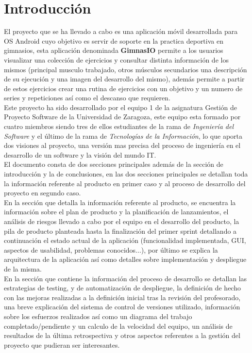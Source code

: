 \documentclass[11pt,a4paper]{report}
\begin{document}
\chapter{Introducción}
El proyecto que se ha llevado a cabo es una aplicación móvil desarrollada para OS Android cuyo objetivo es servir de soporte en la practica deportiva en gimnasios, esta aplicación denominada \textbf{GimnasIO} permite a los usuarios visualizar una colección de ejercicios y consultar distinta información de los mismos (principal musculo trabajado, otros músculos secundarios una descripción de su ejecución y una imagen del desarrollo del mismo), además permite a partir de estos ejercicios crear una rutina de ejercicios con un objetivo y un numero de series y repeticiones así como el descanso que requieren.
\newline
\\Este proyecto ha sido desarrollado por el equipo 1 de la asignatura Gestión de Proyecto Software de la Universidad de Zaragoza, este equipo esta formado por cuatro miembros siendo tres de ellos estudiantes de la rama de \textit{Ingeniería del Software } y el último de la rama de \textit{Tecnologías de la Información}, lo que aporta dos visiones al proyecto, una versión mas precisa del proceso de ingeniería en el desarrollo de un software y la visión del mundo IT.
\newline
\\El documento consta de dos secciones principales además de la sección de introducción y la de conclusiones, en las dos secciones principales se detallan toda la información referente al producto en primer caso y al proceso de desarrollo del proyecto en segundo caso.
\newline
\\En la sección que detalla la información referente al producto, se encuentra la información sobre el plan de producto y la planificación de lanzamientos, el análisis de riesgos llevado a cabo por el equipo en el desarrollo del producto, la pila de producto planteada hasta la finalización del primer sprint detallando a continuación el estado actual de la aplicación (funcionalidad implementada, GUI, aspectos de usabilidad, problemas conocidos...), por último se explica la arquitectura de la aplicación así como detalles sobre implementación y despliegue de la misma.
\newline
\\En la sección que contiene la información del proceso de desarrollo se detallan las estrategias de testing, y de automatización de despliegue, la definición de hecho con las mejoras realizadas a la definición inicial tras la revisión del profesorado, una breve explicación del sistema de control de versiones utilizado, información sobre los esfuerzos realizados así como un diagrama del trabajo completado/pendiente y un calculo de la velocidad del equipo, un análisis de resultados de la última retrospectiva y otros aspectos referentes a la gestión del proyecto que pudieran ser interesantes.
\end{document}
